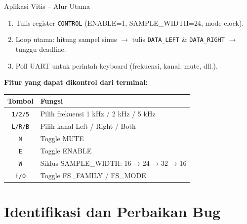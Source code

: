 \documentclass[aspectratio=169]{beamer}
\begin{document}
\begin{frame}{Aplikasi Vitis -- Alur Utama}
  \begin{enumerate}
    \item Tulis register \texttt{CONTROL} (ENABLE=1, SAMPLE\_WIDTH=24, mode clock).
    \item Loop utama: hitung sampel sinus $\rightarrow$ tulis \texttt{DATA\_LEFT} \&
          \texttt{DATA\_RIGHT} $\rightarrow$ tunggu deadline.
    \item Poll UART untuk perintah keyboard (frekuensi, kanal, mute, dll.).
  \end{enumerate}

  \vspace{0.5em}
  \textbf{Fitur yang dapat dikontrol dari terminal:}
  \begin{center}\small
  \begin{tabular}{cl}
    \toprule
    Tombol & Fungsi \\
    \midrule
    \texttt{1/2/5} & Pilih frekuensi 1 kHz / 2 kHz / 5 kHz \\
    \texttt{L/R/B} & Pilih kanal Left / Right / Both \\
    \texttt{M} & Toggle MUTE \\
    \texttt{E} & Toggle ENABLE \\
    \texttt{W} & Siklus SAMPLE\_WIDTH: 16 → 24 → 32 → 16 \\
    \texttt{F/O} & Toggle FS\_FAMILY / FS\_MODE \\
    \bottomrule
  \end{tabular}
  \end{center}
\end{frame}

\section{Identifikasi dan Perbaikan Bug}
\end{document}
